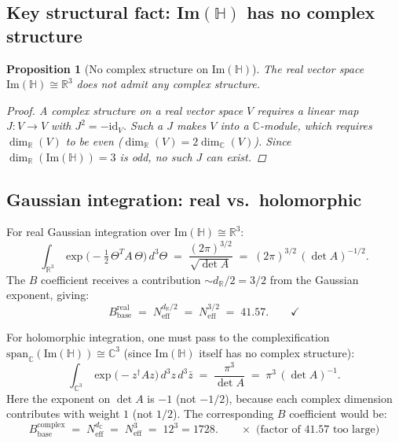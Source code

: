 \documentclass[11pt,a4paper]{article}
\newtheorem{proposition}{Proposition}
\theoremstyle{definition}
\theoremstyle{remark}
\begin{document}
\subsection{Key structural fact: Im$(\mathbb{H})$ has no complex structure}

\begin{proposition}[No complex structure on $\mathrm{Im}(\mathbb{H})$]
\label{prop:no_complex_structure}
  The real vector space $\mathrm{Im}(\mathbb{H}) \cong \mathbb{R}^3$ does not
  admit any complex structure.
  \begin{proof}
    A complex structure on a real vector space $V$ requires a linear map
    $J: V \to V$ with $J^2 = -\mathrm{id}_V$.
    Such a $J$ makes $V$ into a $\mathbb{C}$-module, which requires
    $\dim_\mathbb{R}(V)$ to be even ($\dim_\mathbb{R}(V) = 2\dim_\mathbb{C}(V)$).
    Since $\dim_\mathbb{R}(\mathrm{Im}(\mathbb{H})) = 3$ is odd,
    no such $J$ can exist.
  \end{proof}
\end{proposition}

\subsection{Gaussian integration: real vs.\ holomorphic}

For real Gaussian integration over $\mathrm{Im}(\mathbb{H}) \cong \mathbb{R}^3$:
\begin{equation}
  \int_{\mathbb{R}^3}
    \exp\!\bigl(-\tfrac{1}{2}\,\Theta^T A\,\Theta\bigr)\,d^3\Theta
  \;=\; \frac{(2\pi)^{3/2}}{\sqrt{\det A}}
  \;=\; (2\pi)^{3/2}\,(\det A)^{-1/2}.
  \label{eq:gaussian_real}
\end{equation}
The $B$ coefficient receives a contribution $\sim d_\mathbb{R}/2 = 3/2$
from the Gaussian exponent, giving:
\begin{equation}
  B_{\mathrm{base}}^{\mathrm{real}} \;=\; N_{\mathrm{eff}}^{d_\mathbb{R}/2}
  \;=\; N_{\mathrm{eff}}^{3/2} \;=\; 41.57. \qquad \checkmark
  \label{eq:B_real_result}
\end{equation}

For holomorphic integration, one must pass to the complexification
$\mathrm{span}_\mathbb{C}(\mathrm{Im}(\mathbb{H})) \cong \mathbb{C}^3$
(since $\mathrm{Im}(\mathbb{H})$ itself has no complex structure):
\begin{equation}
  \int_{\mathbb{C}^3}
    \exp\!\bigl(-z^\dagger A z\bigr)\,d^3z\,d^3\bar{z}
  \;=\; \frac{\pi^3}{\det A}
  \;=\; \pi^3\,(\det A)^{-1}.
  \label{eq:gaussian_holomorphic}
\end{equation}
Here the exponent on $\det A$ is $-1$ (not $-1/2$), because each complex
dimension contributes with weight $1$ (not $1/2$).
The corresponding $B$ coefficient would be:
\begin{equation}
  B_{\mathrm{base}}^{\mathrm{complex}} \;=\; N_{\mathrm{eff}}^{d_\mathbb{C}}
  \;=\; N_{\mathrm{eff}}^{3}
  \;=\; 12^3 = 1728.
  \qquad \times \text{ (factor of 41.57 too large)}
  \label{eq:B_complex_result}
\end{equation}
\end{document}
